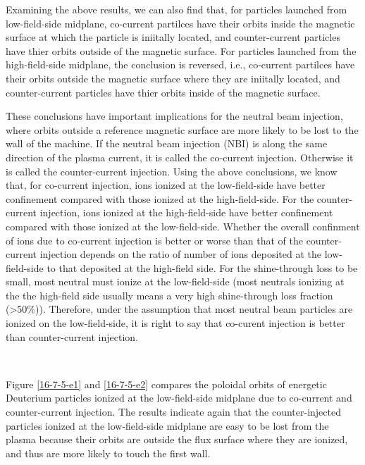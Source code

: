 \documentclass{article}
\begin{document}
Examining the above results, we can also find that, for particles launched
from low-field-side midplane, co-current partilces have their orbits inside
the magnetic surface at which the particle is iniitally located, and
counter-current particles have thier orbits outside of the magnetic surface.
For particles launched from the high-field-side midplane, the conclusion is
reversed, i.e., co-current partilces have their orbits outside the magnetic
surface where they are iniitally located, and counter-current particles have
thier orbits inside of the magnetic surface.

These conclusions have important implications for the neutral beam injection,
where orbits outside a reference magnetic surface are more likely to be lost
to the wall of the machine. If the neutral beam injection (NBI) is along the
same direction of the plasma current, it is called the co-current injection.
Otherwise it is called the counter-current injection. Using the above
conclusions, we know that, for co-current injection, ions ionized at the
low-field-side have better confinement compared with those ionized at the
high-field-side. For the counter-current injection, ions ionized at the
high-field-side have better confinement compared with those ionized at the
low-field-side. Whether the overall confinment of ions due to co-current
injection is better or worse than that of the counter-current injection
depends on the ratio of number of ions deposited at the low-field-side to that
deposited at the high-field side. For the shine-through loss to be small, most
neutral must ionize at the low-field-side (most neutrals ionizing at the the
high-field side usually means a very high shine-through loss fraction
(>50\%)). Therefore, under the assumption that most neutral beam particles are
ionized on the low-field-side, it is right to say that co-curent injection is
better than counter-current injection.

\

Figure \ref{16-7-5-e1} and \ref{16-7-5-e2} compares the poloidal orbits of
energetic Deuterium particles ionized at the low-field-side midplane due to
co-current and counter-current injection. The results indicate again that the
counter-injected particles ionized at the low-field-side midplane are easy to
be lost from the plasma because their orbits are outside the flux surface
where they are ionized, and thus are more likely to touch the first wall.
\end{document}
